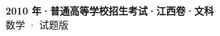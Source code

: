 \documentclass[zihao=-4, a4paper]{ctexart}
\begin{document}
\begin{center}
  {\Large\bfseries 2010 年·普通高等学校招生考试·江西卷·文科}\\[4pt]
  {\large 数学 · 试题版}
\end{center}
\medskip
{}

\end{document}
